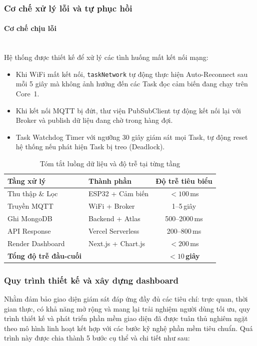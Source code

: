 \documentclass[12pt,a4paper]{article}
\begin{document}
\subsubsection{Cơ chế xử lý lỗi và tự phục hồi}
\paragraph{Cơ chế chịu lỗi}\mbox{}\\

Hệ thống được thiết kế để xử lý các tình huống mất kết nối mạng:
\begin{itemize}
    \item Khi WiFi mất kết nối, \texttt{taskNetwork} tự động thực hiện Auto-Reconnect sau mỗi 5 giây mà không ảnh hưởng đến các Task đọc cảm biến đang chạy trên Core~1.
    \item Khi kết nối MQTT bị đứt, thư viện PubSubClient tự động kết nối lại với Broker và publish dữ liệu đang chờ trong hàng đợi.
    \item Task Watchdog Timer với ngưỡng 30 giây giám sát mọi Task, tự động reset hệ thống nếu phát hiện Task bị treo (Deadlock).
\end{itemize}

\begin{table}[H]
\centering
\begin{tabular}{|l|l|c|}
\hline
\textbf{Tầng xử lý} & \textbf{Thành phần} & \textbf{Độ trễ tiêu biểu} \\ 
        \hline
Thu thập \& Lọc   & ESP32 + Cảm biến         & $< 100$\,ms \\ 
        \hline
Truyền MQTT        & WiFi + Broker            & 1--5\,giây \\ 
        \hline
Ghi MongoDB        & Backend + Atlas          & 500--2000\,ms \\ 
        \hline
API Response       & Vercel Serverless        & 200--800\,ms \\ 
        \hline
Render Dashboard   & Next.js + Chart.js       & $< 200$\,ms \\ 
        \hline
\textbf{Tổng độ trễ đầu-cuối} & & \textbf{$< 10$\,giây} \\ 
        \hline\end{tabular}
\caption{Tóm tắt luồng dữ liệu và độ trễ tại từng tầng}
\label{tab:latency}

\end{table}

\subsubsection{Quy trình thiết kế và xây dựng dashboard}
Nhằm đảm bảo giao diện giám sát đáp ứng đầy đủ các tiêu chí: trực quan, thời gian thực, có khả năng mở rộng và mang lại trải nghiệm người dùng tối ưu, quy trình thiết kế và phát triển phần mềm giao diện đã được tuân thủ nghiêm ngặt theo mô hình linh hoạt kết hợp với các bước kỹ nghệ phần mềm tiêu chuẩn. Quá trình này được chia thành 5 bước cụ thể và chi tiết như sau:
\end{document}
